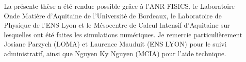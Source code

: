 La présente thèse a été rendue possible grâce à l'ANR FISICS, le Laboratoire Onde Matière d'Aquitaine de l'Université de Bordeaux, le Laboratoire de Physique de l'ENS Lyon et le Mésocentre de Calcul Intensif d'Aquitaine sur lesquelles ont été faites les simulations numériques. Je remercie particulièrement Josiane Parzych (LOMA) et Laurence Mauduit (ENS LYON) pour le suivi administratif, ainsi que Nguyen Ky Nguyen (MCIA) pour l'aide technique.
